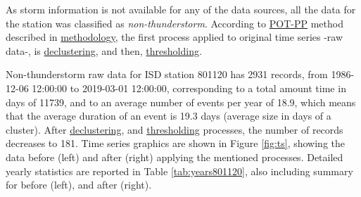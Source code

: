 \documentclass[12pt,oneside]{reedthesis}
\begin{document}
As storm information is not available for any of the data sources, all the data for the station was classified as \emph{non-thunderstorm}. According to \protect\hyperlink{pot-pp}{POT-PP} method described in \protect\hyperlink{rmd-method}{methodology}, the first process applied to original time series -raw data-, is \protect\hyperlink{decluster}{declustering}, and then, \protect\hyperlink{thresholding}{thresholding}.

Non-thunderstorm raw data for ISD station 801120 has 2931 records, from 1986-12-06 12:00:00 to 2019-03-01 12:00:00, corresponding to a total amount time in days of 11739, and to an average number of events per year of 18.9, which means that the average duration of an event is 19.3 days (average size in days of a cluster). After \protect\hyperlink{decluster}{declustering}, and \protect\hyperlink{thresholding}{thresholding} processes, the number of records decreases to 181. Time series graphics are shown in Figure \ref{fig:ts}, showing the data before (left) and after (right) applying the mentioned processes. Detailed yearly statistics are reported in Table \ref{tab:years801120}, also including summary for before (left), and after (right).
\end{document}
